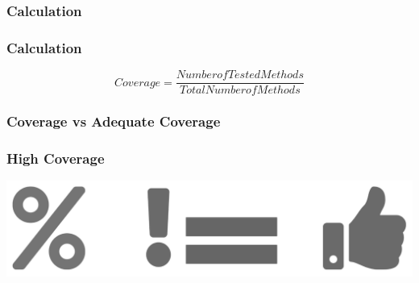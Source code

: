 \subsubsection{Calculation}
%
%
\begin{frame}
	\frametitle{Calculation}
	\begin{center}
		\begin{equation*}
			Coverage = \frac{Number of Tested Methods}{Total Number of Methods}
		\end{equation*}
	\end{center}
\end{frame}

\subsubsection{Coverage vs Adequate Coverage}
%
%
\begin{frame}
	\frametitle{High Coverage}
		\begin{center}
			\includegraphics[scale = .15]{images/percentEquals}
		\end{center}
\end{frame}
